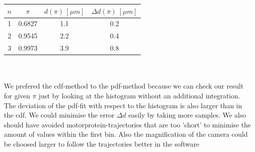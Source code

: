     	\minipanf
    		\centering
    		\begin{tabular}{c|c|c|c}
    	 	       $n$ & $\pi$ & $d(\pi)\ [\unit{\mu m}]$  & $\Delta d(\pi)\ [\unit{\mu m}]$\\
    	 	 \hline		1	& 	0.6827	&	1.1 	& 	0.2\\
    	  				2	&	0.9545	&	2.2		&	0.4\\
    	  				3	&	0.9973	&	3.9		& 	0.8	
    		\end{tabular}
    	\minipend\\
    	\ \\
    	We prefered the cdf-method to the pdf-method because we can check our result for given $\pi$ just by looking at the histogram without an additional integration. The deviation of the pdf-fit with respect to the histogram is also larger than in the cdf. We could minimise the error $\Delta d$ easily by taking more samples. We also should have avoided motorprotein-trajectories that are too 'short' to minimise the amount of values within the first bin. Also the magnification of the camera could be choosed larger to follow the trajectories better in the software
